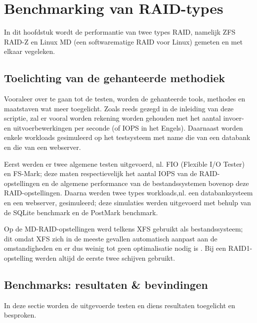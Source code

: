 

\chapter{Benchmarking van RAID-types}
\label{ch:h8}

In dit hoofdstuk wordt de performantie van twee types RAID, namelijk ZFS RAID-Z en Linux MD (een softwarematige RAID voor Linux) gemeten en met elkaar vegeleken.

\section{Toelichting van de gehanteerde methodiek}

Vooraleer over te gaan tot de testen, worden de gehanteerde tools, methodes en maatstaven wat meer toegelicht. Zoals reeds gezegd in de inleiding van deze scriptie, zal er vooral worden rekening worden gehouden met het aantal invoer- en uitvoerbewerkingen per seconde (of IOPS in het Engels). Daarnaast worden enkele workloads gesimuleerd op het testsysteem met name die van een databank en die van een webserver.  

Eerst werden er twee algemene testen uitgevoerd, nl. FIO (Flexible I/O Tester) en FS-Mark; deze maten respectievelijk het aantal IOPS van de RAID-opstellingen en de algemene performance van de bestandssystemen bovenop deze RAID-opstellingen. Daarna werden twee types workloads,nl. een databanksysteem en een webserver, gesimuleerd; deze simulaties werden uitgevoerd met behulp van de SQLite benchmark en de PostMark benchmark.

Op de MD-RAID-opstellingen werd telkens XFS gebruikt als bestandssysteem; dit omdat XFS zich in de meeste gevallen automatisch aanpast aan de omstandigheden en er dus weinig tot geen optimalisatie nodig is \autocite{XFSCommunity2016}. Bij een RAID1-opstelling werden altijd de eerste twee schijven gebruikt.

\section{Benchmarks: resultaten \& bevindingen}

In deze sectie worden de uitgevoerde testen en diens resultaten toegelicht en besproken.


